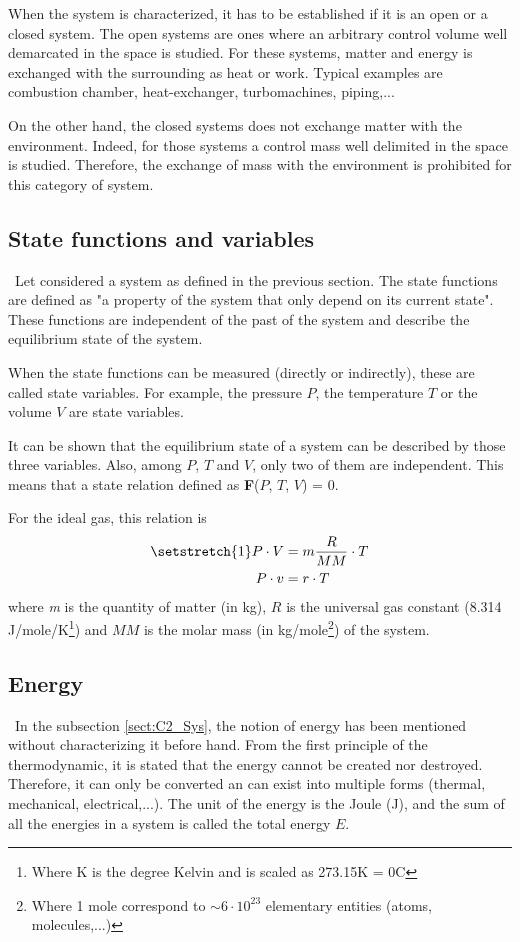 When the system is characterized, it has to be established if it is an open or a closed system.
The open systems are ones where an arbitrary control volume well demarcated in the space is studied. For these systems, matter and energy is exchanged with the surrounding as heat or work. Typical examples are combustion chamber, heat-exchanger, turbomachines, piping,...

On the other hand, the closed systems does not exchange matter with the environment. Indeed, 
for those systems a control mass well delimited in the space is studied. Therefore, the exchange of mass with the environment is prohibited for this category of system. 

\subsection{State functions and variables}\label{sect:C2_State}
\quad\, Let considered a system as defined in the previous section. The state functions are defined as "a property of the system that only depend on its current state". These functions are independent of the past of the system and describe the equilibrium state of the system.

When the state functions can be measured (directly or indirectly), these are called state variables. For example, the pressure $P$, the temperature $T$ or the volume $V$ are state variables.

It can be shown that the equilibrium state of a system can be described by those three variables. Also, among $P$, $T$ and $V$, only two of them are independent. This means that a state relation defined as \textbf{F}($P$, $T$, $V$) = 0.

For the ideal gas, this relation is
\begin{align}
\setstretch{1}
P\cdot V &= m\frac{R}{MM}\cdot T\nonumber\\
P\cdot v &= r\cdot T\label{eq:C2_GP}    
\end{align}
where \textit{m} is the quantity of matter (in kg), $R$ is the universal gas constant (8.314 J/mole/K\footnote{Where K is the degree Kelvin and is scaled as 273.15\degree K = 0\degree C}) and $MM$ is the molar mass (in kg/mole\footnote{Where 1 mole correspond to $\sim 6\cdot 10^{23}$ elementary entities (atoms, molecules,...)}) of the system.
\newpage
\subsection{Energy}\label{sect:C2_Ener}
\quad\, In the subsection \ref{sect:C2_Sys}, the notion of energy has been mentioned without characterizing it before hand. From the first principle of the thermodynamic, it is stated that the energy cannot be created nor destroyed. Therefore, it can only be converted an can exist into multiple forms (thermal, mechanical, electrical,...)\cite{thermoApp_2}. The unit of the energy is the Joule (J), and the sum of all the energies in a system is called the total energy $E$.

